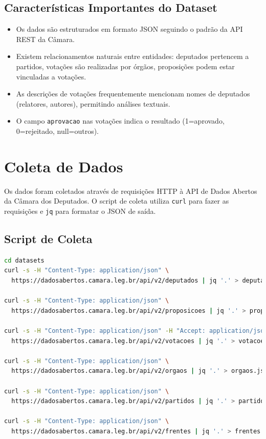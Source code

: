 \documentclass[12pt,a4paper]{article}
\begin{document}
\subsection{Características Importantes do Dataset}

\begin{itemize}
    \item Os dados são estruturados em formato JSON seguindo o padrão da API REST da Câmara.
    \item Existem relacionamentos naturais entre entidades: deputados pertencem a partidos, votações são realizadas por órgãos, proposições podem estar vinculadas a votações.
    \item As descrições de votações frequentemente mencionam nomes de deputados (relatores, autores), permitindo análises textuais.
    \item O campo \texttt{aprovacao} nas votações indica o resultado (1=aprovado, 0=rejeitado, null=outros).
\end{itemize}

\section{Coleta de Dados}

Os dados foram coletados através de requisições HTTP à API de Dados Abertos da Câmara dos Deputados. O script de coleta utiliza \texttt{curl} para fazer as requisições e \texttt{jq} para formatar o JSON de saída.

\subsection{Script de Coleta}

\begin{lstlisting}[language=bash,caption=Script de coleta de dados]
cd datasets
curl -s -H "Content-Type: application/json" \
  https://dadosabertos.camara.leg.br/api/v2/deputados | jq '.' > deputados.json

curl -s -H "Content-Type: application/json" \
  https://dadosabertos.camara.leg.br/api/v2/proposicoes | jq '.' > proposicoes.json

curl -s -H "Content-Type: application/json" -H "Accept: application/json" \
  https://dadosabertos.camara.leg.br/api/v2/votacoes | jq '.' > votacoes.json

curl -s -H "Content-Type: application/json" \
  https://dadosabertos.camara.leg.br/api/v2/orgaos | jq '.' > orgaos.json

curl -s -H "Content-Type: application/json" \
  https://dadosabertos.camara.leg.br/api/v2/partidos | jq '.' > partidos.json

curl -s -H "Content-Type: application/json" \
  https://dadosabertos.camara.leg.br/api/v2/frentes | jq '.' > frentes.json
\end{lstlisting}
\end{document}
